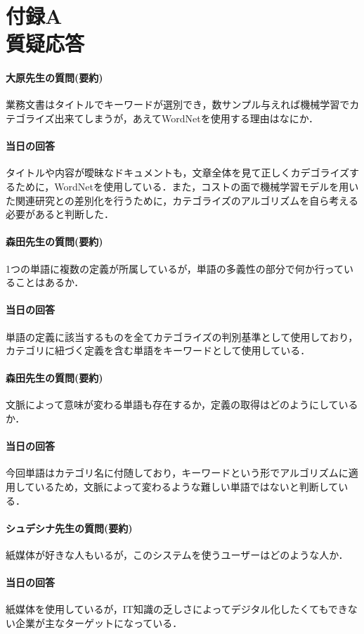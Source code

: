 
\chapter*{付録A\\質疑応答}

\subsubsection*{大原先生の質問(要約)}
業務文書はタイトルでキーワードが選別でき，数サンプル与えれば機械学習でカテゴライズ出来てしまうが，あえてWordNetを使用する理由はなにか．
\subsubsection*{当日の回答}
タイトルや内容が曖昧なドキュメントも，文章全体を見て正しくカデゴライズするために，WordNetを使用している．また，コストの面で機械学習モデルを用いた関連研究との差別化を行うために，カテゴライズのアルゴリズムを自ら考える必要があると判断した．

\subsubsection*{森田先生の質問(要約)}
1つの単語に複数の定義が所属しているが，単語の多義性の部分で何か行っていることはあるか．
\subsubsection*{当日の回答}
単語の定義に該当するものを全てカテゴライズの判別基準として使用しており，カテゴリに紐づく定義を含む単語をキーワードとして使用している．

\subsubsection*{森田先生の質問(要約)}
文脈によって意味が変わる単語も存在するか，定義の取得はどのようにしているか．
\subsubsection*{当日の回答}
今回単語はカテゴリ名に付随しており，キーワードという形でアルゴリズムに適用しているため，文脈によって変わるような難しい単語ではないと判断している．

\subsubsection*{シュデシナ先生の質問(要約)}
紙媒体が好きな人もいるが，このシステムを使うユーザーはどのような人か．
\subsubsection*{当日の回答}
紙媒体を使用しているが，IT知識の乏しさによってデジタル化したくてもできない企業が主なターゲットになっている．
